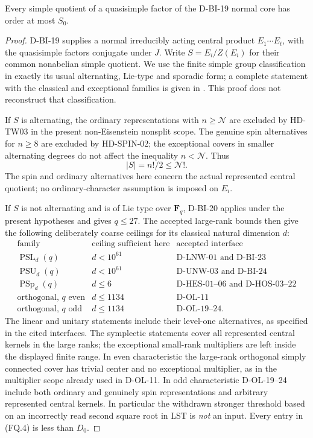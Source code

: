\begin{lemma}[HD-FQ01]
Every simple quotient of a quasisimple factor of the D-BI-19 normal core
has order at most $S_0$.
\end{lemma}

\begin{proof}
D-BI-19 supplies a normal irreducibly acting central product
$E_1\cdots E_t$, with the quasisimple factors conjugate under $J$.
Write $S=E_i/Z(E_i)$ for their common nonabelian simple quotient.
We use the finite simple group classification in exactly its usual
alternating, Lie-type and sporadic form; a complete statement with the
classical and exceptional families is given in
\cite[\S2.2.1, author p.~13]{HES:LiXia2022}.
This proof does not reconstruct that classification.

If $S$ is alternating, the ordinary representations with $n\ge\mathcal N$
are excluded by HD-TW03 in the present non-Eisenstein nonsplit scope.
The genuine spin alternatives for $n\ge8$ are excluded by HD-SPIN-02;
the exceptional covers in smaller alternating degrees do not affect
the inequality $n<\mathcal N$.  Thus
\[
                         |S|=n!/2\le\mathcal N!.
                                                               \tag{FQ.3}
\]
The spin and ordinary alternatives here concern the actual represented
central quotient; no ordinary-character assumption is imposed on $E_i$.

If $S$ is not alternating and is of Lie type over $\mathbf F_q$,
D-BI-20 applies under the present hypotheses and gives $q\le27$.
The accepted large-rank bounds then give the following deliberately
coarse ceilings for its classical natural dimension $d$:
\[
\begin{array}{c|c|l}
\text{family}&\text{ceiling sufficient here}&\text{accepted interface}\\ \hline
\operatorname{PSL}_{d}(q)&d<10^{61}&\text{D-LNW-01 and D-BI-23}\\
\operatorname{PSU}_{d}(q)&d<10^{61}&\text{D-UNW-03 and D-BI-24}\\
\operatorname{PSp}_{d}(q)&d\le6&\text{D-HES-01--06 and D-HOS-03--22}\\
\text{orthogonal, }q\text{ even}&d\le1134&\text{D-OL-11}\\
\text{orthogonal, }q\text{ odd}&d\le1134&\text{D-OL-19--24}.
\end{array}                                                    \tag{FQ.4}
\]
The linear and unitary statements include their level-one alternatives,
as specified in the cited interfaces.  The symplectic statements cover
all represented central kernels in the large ranks; the exceptional
small-rank multipliers are left inside the displayed finite range.
In even characteristic the large-rank orthogonal simply connected cover
has trivial center and no exceptional multiplier, as in the multiplier
scope already used in D-OL-11.  In odd characteristic D-OL-19--24 include
both ordinary and genuinely spin representations and arbitrary
represented central kernels.  In particular the withdrawn stronger
threshold based on an incorrectly read second square root in LST is
\emph{not} an input.  Every entry in (FQ.4) is less than $D_0$.


\end{proof}
